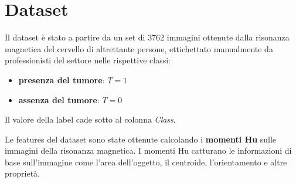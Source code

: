 \chapter{Dataset}
Il dataset è stato a partire da un set di $3762$ immagini ottenute dalla risonanza
magnetica del cervello di altrettante persone, ettichettato manualmente da professionisti
del settore nelle rispettive classi:
\begin{itemize}
    \item \textbf{presenza del tumore}: $T = 1$
    \item \textbf{assenza del tumore}: $T = 0$
\end{itemize} 
Il valore della label cade sotto al colonna \textit{Class}.

Le features del dataset sono state ottenute calcolando i \textbf{momenti Hu}  sulle 
immagini della risonanza magnetica. I momenti Hu catturano le informazioni di base
sull'immagine come l'area dell'oggetto, il centroide, l'orientamento e altre proprietà.

